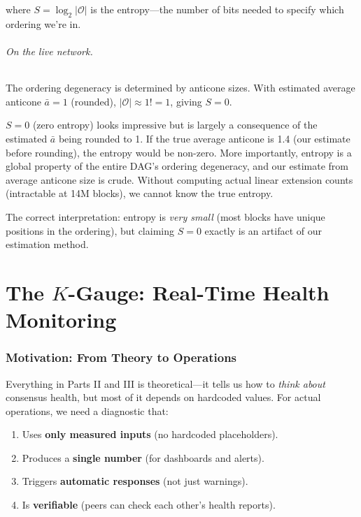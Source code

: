 \documentclass[11pt,a4paper]{article}
\begin{document}
where $S = \log_2 |\mathcal{O}|$ is the entropy---the number of bits needed to specify which ordering we're in.

\paragraph{On the live network.} The ordering degeneracy is determined by anticone sizes. With estimated average anticone $\bar{a} = 1$ (rounded), $|\mathcal{O}| \approx 1! = 1$, giving $S = 0$.

\begin{honesty}
$S = 0$ (zero entropy) looks impressive but is largely a consequence of the estimated $\bar{a}$ being rounded to 1. If the true average anticone is 1.4 (our estimate before rounding), the entropy would be non-zero. More importantly, entropy is a global property of the entire DAG's ordering degeneracy, and our estimate from average anticone size is crude. Without computing actual linear extension counts (intractable at 14M blocks), we cannot know the true entropy.

The correct interpretation: entropy is \emph{very small} (most blocks have unique positions in the ordering), but claiming $S = 0$ exactly is an artifact of our estimation method.
\end{honesty}

\part{The $K$-Gauge: Real-Time Health Monitoring}

\section{Motivation: From Theory to Operations}

Everything in Parts II and III is theoretical---it tells us how to \emph{think about} consensus health, but most of it depends on hardcoded values. For actual operations, we need a diagnostic that:

\begin{enumerate}
    \item Uses \textbf{only measured inputs} (no hardcoded placeholders).
    \item Produces a \textbf{single number} (for dashboards and alerts).
    \item Triggers \textbf{automatic responses} (not just warnings).
    \item Is \textbf{verifiable} (peers can check each other's health reports).
\end{enumerate}
\end{document}
